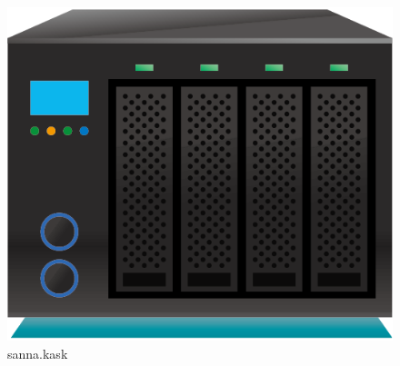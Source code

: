 \begin{figure}[hbt!]
    \centering
    \captionsetup{width=.33\linewidth}
    \begin{minipage}[t]{0.33\textwidth}
        \includegraphics[width=\textwidth]{figures/servers/sanna.kask.png}
        \caption{sanna.kask}\label{fig:sanna.kask}
    \end{minipage}
    \hspace{3cm}
    \centering
    \captionsetup{width=.21\linewidth}
    \begin{minipage}[t]{0.21\textwidth}

\end{minipage}
\end{figure}
